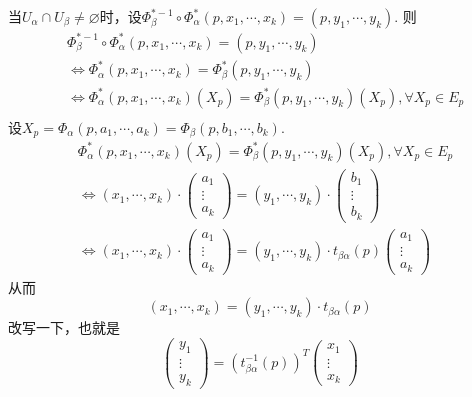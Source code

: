 当$U_{\alpha}\cap U_{\beta}\neq\varnothing$时，设$\varPhi^{\ast -1}_{\beta}\circ\varPhi^{\ast}_{\alpha}(p,x_{1},\cdots,x_{k})=(p,y_{1},\cdots,y_{k})$. 则
\[
\begin{split}
&\varPhi^{\ast -1}_{\beta}\circ\varPhi^{\ast}_{\alpha}(p,x_{1},\cdots,x_{k})=(p,y_{1},\cdots,y_{k})\\
&\Leftrightarrow \varPhi^{\ast}_{\alpha}(p,x_{1},\cdots,x_{k})=\varPhi^{\ast}_{\beta}(p,y_{1},\cdots,y_{k})\\
&\Leftrightarrow \varPhi^{\ast}_{\alpha}(p,x_{1},\cdots,x_{k})(X_{p})=\varPhi^{\ast}_{\beta}(p,y_{1},\cdots,y_{k})(X_{p}),\forall X_{p}\in E_{p}\\
\end{split}
\]
设$X_{p}=\varPhi_{\alpha}(p,a_{1},\cdots,a_{k})=\varPhi_{\beta}(p,b_{1},\cdots,b_{k})$. 
\[
\begin{split}
&\varPhi^{\ast}_{\alpha}(p,x_{1},\cdots,x_{k})(X_{p})=\varPhi^{\ast}_{\beta}(p,y_{1},\cdots,y_{k})(X_{p}),\forall X_{p}\in E_{p}\\
&\Leftrightarrow(x_{1},\cdots,x_{k})\cdot \left( \begin{array}{ccc}{a_{1}} \\ {\vdots}  \\ {a_{k}} \end{array}\right)=(y_{1},\cdots,y_{k})\cdot \left( \begin{array}{ccc}{b_{1}} \\ {\vdots}  \\ {b_{k}} \end{array}\right)\\
&\Leftrightarrow (x_{1},\cdots,x_{k})\cdot \left( \begin{array}{ccc}{a_{1}} \\ {\vdots}  \\ {a_{k}} \end{array}\right)=(y_{1},\cdots,y_{k})\cdot t_{\beta\alpha}(p) \left( \begin{array}{ccc}{a_{1}} \\ {\vdots}  \\ {a_{k}} \end{array}\right)
\end{split}
\]
从而
\[
(x_{1},\cdots,x_{k})=(y_{1},\cdots,y_{k})\cdot t_{\beta\alpha}(p)
\]
改写一下，也就是
\[
\left( \begin{array}{ccc}{y_{1}} \\ {\vdots}  \\ {y_{k}} \end{array}\right)=\left(t^{-1}_{\beta\alpha}(p)\right)^{T} \left( \begin{array}{ccc}{x_{1}} \\ {\vdots}  \\ {x_{k}} \end{array}\right)
\]
 
